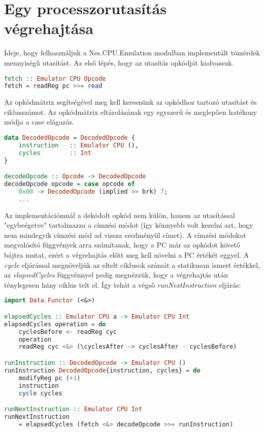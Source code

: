 \section{Egy processzorutasítás végrehajtása}
Ideje, hogy felhasználjuk a Nes.CPU.Emulation modulban implementált tömérdek mennyiségű utasítást. Az első lépés, hogy az utasítás opkódját kiolvassuk.
\vspace{0.3cm}
\begin{lstlisting}[language=Haskell, basicstyle=\scriptsize]
fetch :: Emulator CPU Opcode
fetch = readReg pc >>= read
\end{lstlisting}
\vspace{0.2cm}
Az opkódmátrix segítségével meg kell keresnünk az opkódhoz tartozó utasítást és ciklusszámot. Az opkódmátrix eltárolásának egy egyszerű és meglepően hatékony módja a case elágazás.
\vspace{0.2cm}
\begin{lstlisting}[language=Haskell, basicstyle=\scriptsize]
data DecodedOpcode = DecodedOpcode {
	instruction   :: Emulator CPU (),
	cycles        :: Int
}

decodeOpcode :: Opcode -> DecodedOpcode
decodeOpcode opcode = case opcode of
	0x00 -> DecodedOpcode (implied >> brk) 7;
	...
\end{lstlisting}
\vspace{0.3cm}
Az implementációmnál a dekódolt opkód nem külön, hanem az utasítással "egybeégetve" tartalmazza a címzési módot (így könnyebb volt kezelni azt, hogy nem mindegyik címzési mód ad vissza eredményül címet). A címzési módokat megvalósító függvények arra számítanak, hogy a PC már az opkódot követő bájtra mutat, ezért a végrehajtás előtt meg kell növelni a PC értékét eggyel.
A \emph{cycle} eljárással megnöveljük az eltelt ciklusok számát a statikusan ismert értékkel, az \emph{elapsedCycles} függvénnyel pedig megnézzük, hogy a végrehajtás után ténylegesen hány ciklus telt el.
Így tehát a végső \emph{runNextInstruction} eljárás:
\vspace{0.3cm}
\begin{lstlisting}[language=Haskell, basicstyle=\scriptsize]
import Data.Functor (<&>)

elapsedCycles :: Emulator CPU a -> Emulator CPU Int
elapsedCycles operation = do
	cyclesBefore <- readReg cyc
	operation
	readReg cyc <&> (\cyclesAfter -> cyclesAfter - cyclesBefore)

runInstruction :: DecodedOpcode -> Emulator CPU ()
runInstruction DecodedOpcode{instruction, cycles} = do
	modifyReg pc (+1)
	instruction
	cycle cycles

runNextInstruction :: Emulator CPU Int
runNextInstruction 
 	= elapsedCycles (fetch <&> decodeOpcode >>= runInstruction)
\end{lstlisting}

